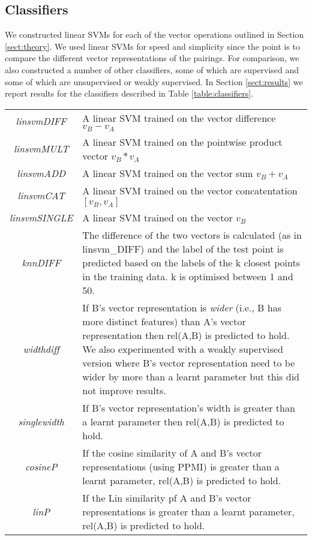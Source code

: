 \documentclass[11pt]{article}
\begin{document}
\subsection{Classifiers}

We constructed linear SVMs for each of the vector operations outlined in Section \ref{sect:theory}.  We used linear SVMs for speed and simplicity since the point is to compare the different vector representations of the pairings.  For comparison, we also constructed a number of other classifiers, some of which are supervised and some of which are unsupervised or weakly supervised.  In Section \ref{sect:results} we report results for the classifiers described in Table \ref{table:classifiers}.

\begin{table*}[ht]
\centering
\begin{tabular}{|c|p{14cm}|}
\hline
\emph{linsvmDIFF}& A linear SVM trained on the vector difference $v_B - v_A$\\
\emph{linsvmMULT}& A linear SVM trained on the pointwise product vector $v_B * v_A$\\
\emph{linsvmADD}& A linear SVM trained on the vector sum $v_B + v_A$\\
\emph{linsvmCAT}& A linear SVM trained on the vector concatentation $[v_B,v_A]$\\
\emph{linsvmSINGLE}& A linear SVM trained on the vector $v_B$\\
\emph{knnDIFF}& The difference of the two vectors is calculated (as in linsvm\_DIFF) and the label of the test point is predicted based on the labels of the k closest points in the training data. k is optimised between 1 and 50.\\
\emph{widthdiff}& If B's vector representation is \textit{wider} (i.e., B has more distinct features) than A's vector representation then rel(A,B) is predicted to hold.  We also experimented with a weakly supervised version where B's vector representation need to be wider by more than a learnt parameter but this did not improve results.\\
\emph{singlewidth}& If B's vector representation's width is greater than a learnt parameter then rel(A,B) is predicted to hold.\\
\emph{cosineP}& If the cosine similarity of A and B's vector representations (using PPMI) is greater than a learnt parameter, rel(A,B) is predicted to hold.\\
\emph{linP}&If the Lin similarity \cite{Lin1998} pf A and B's vector representations is greater than a learnt parameter, rel(A,B) is predicted to hold.\\

\end{tabular}
\end{table*}
\end{document}
